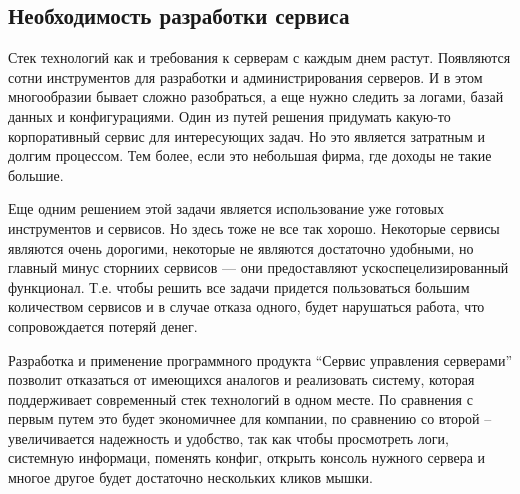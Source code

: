 \subsection{Необходимость разработки сервиса}

Стек технологий как и требования к серверам с каждым днем растут. Появляются сотни инструментов для разработки и администрирования серверов. И в этом многообразии бывает сложно разобраться, а еще нужно следить за логами, базай данных и конфигурациями. Один из путей решения придумать какую-то корпоративный сервис для интересующих задач. Но это является затратным и долгим процессом. Тем более, если это небольшая фирма, где доходы не такие большие.

Еще одним решением этой задачи является использование уже готовых инструментов и сервисов. Но здесь тоже не все так хорошо. Некоторые сервисы являются очень дорогими, некоторые не являются достаточно удобными, но главный минус сторниих сервисов — они предоставляют ускоспецелизированный функционал. Т.е. чтобы решить все задачи придется пользоваться большим количеством сервисов и в случае отказа одного, будет нарушаться работа, что сопровождается потеряй денег.

Разработка и применение программного продукта “Сервис управления серверами” позволит отказаться от имеющихся аналогов и реализовать
систему, которая поддерживает современный стек технологий в одном месте. По сравнения с первым путем это будет экономичнее для компании, по сравнению со второй – увеличивается надежность и удобство, так как чтобы просмотреть логи, системную информаци, поменять конфиг, открыть консоль нужного сервера и многое другое будет достаточно нескольких кликов мышки.

